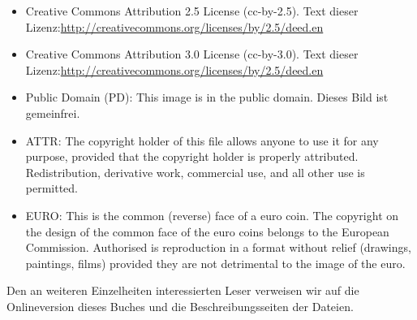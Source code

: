 \begin{small}
\begin{itemize}
\item Creative Commons Attribution 2.5 License (cc-by-2.5). Text dieser Lizenz:\newline{}\url{http://creativecommons.org/licenses/by/2.5/deed.en}

\item Creative Commons Attribution 3.0 License (cc-by-3.0). Text dieser Lizenz:\newline{}\url{http://creativecommons.org/licenses/by/2.5/deed.en}

\item Public Domain (PD): This image is in the public domain. Dieses Bild ist gemeinfrei.

\item ATTR:  The copyright holder of this file allows anyone to use it for any purpose, provided that the copyright holder is properly attributed. Redistribution, derivative work, commercial use, and all other use is permitted. 

\item EURO: This is the common (reverse) face of a euro coin. The copyright on the design of the common face of the euro coins belongs to the European Commission. Authorised is reproduction in a format without relief (drawings, paintings, films) provided they are not detrimental to the image of the euro.

\end{itemize}

Den an weiteren Einzelheiten interessierten Leser verweisen wir auf die Onlineversion dieses Buches und die Beschreibungsseiten der Dateien.

\end{small}

\pagebreak
